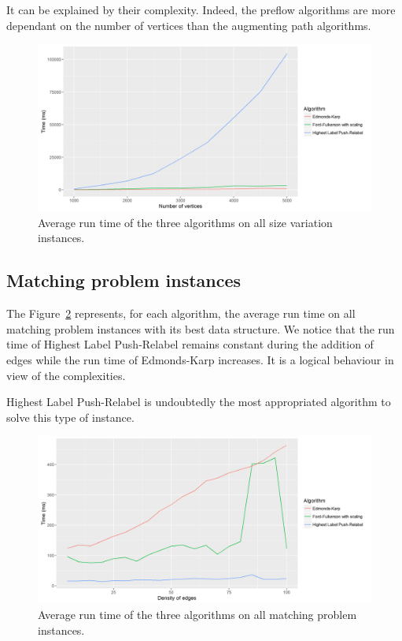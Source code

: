 It can be explained by their complexity. Indeed, the preflow algorithms are more dependant on the number of vertices than the augmenting path algorithms.

\begin{figure}[H]
\begin{center}
\includegraphics[scale=0.5]{images/meansize.png}
\caption{Average run time of the three algorithms on all size variation instances.}
\label{fig:MeanInstancesize}
\end{center}
\end{figure}

\subsection{Matching problem instances}
The Figure~\ref{fig:meanmatchingproblem} represents, for each algorithm, the average run time on all matching problem instances with its best data structure. We notice that the run time of Highest Label Push-Relabel remains constant during the addition of edges while the run time of Edmonds-Karp increases. It is a logical behaviour in view of the complexities.

Highest Label Push-Relabel is undoubtedly the most appropriated algorithm to solve this type of instance. 

\begin{figure}[H]
\begin{center}
\includegraphics[scale=0.5]{images/meanmatching.png}
\caption{Average run time of the three algorithms on all matching problem instances.}
\label{fig:meanmatchingproblem}
\end{center}
\end{figure}
